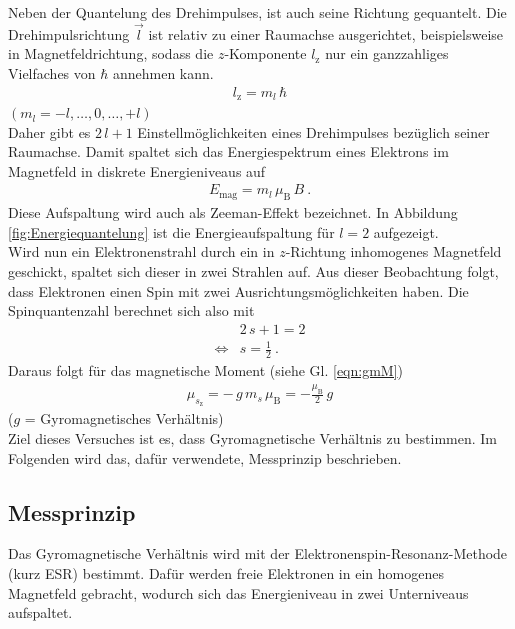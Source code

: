 Neben der Quantelung des Drehimpulses, ist auch seine Richtung gequantelt. Die Drehimpulsrichtung $\vec{l}$ ist relativ zu einer Raumachse ausgerichtet, beispielsweise in Magnetfeldrichtung, sodass die $z$-Komponente $l_\text{z}$ nur ein ganzzahliges Vielfaches von $\hbar$ annehmen kann.
\begin{align}
	l_\text{z} = m_l\, \hbar
\end{align}
\hspace{1.9cm} {\footnotesize$(m_l = -l, \dots, 0, \dots, +l)$} \vspace{0.25cm}\\
Daher gibt es $2\,l + 1$ Einstellmöglichkeiten eines Drehimpulses bezüglich seiner Raumachse. Damit spaltet sich das Energiespektrum eines Elektrons im Magnetfeld in diskrete Energieniveaus auf
\begin{align}
	E_\text{mag} = m_l\, \mu_\text{B}\, B \ .
\end{align}
Diese Aufspaltung wird auch als Zeeman-Effekt bezeichnet. In Abbildung \eqref{fig:Energiequantelung} ist die Energieaufspaltung für $l = 2$ aufgezeigt. \\
Wird nun ein Elektronenstrahl durch ein in $z$-Richtung inhomogenes Magnetfeld geschickt, spaltet sich dieser in zwei Strahlen auf. Aus dieser Beobachtung folgt, dass Elektronen einen Spin mit zwei Ausrichtungsmöglichkeiten haben. Die Spinquantenzahl berechnet sich also mit
\begin{align*}
	&2\, s + 1 = 2 \\
	\Leftrightarrow &s = \frac{1}{2} \ .
\end{align*}
Daraus folgt für das magnetische Moment (siehe Gl. \eqref{eqn:gmM})
\begin{align*}
	\mu_{s_\text{z}} = -\,g \,m_s \,\mu_\text{B} = -\frac{\mu_\text{B}}{2}\, g
\end{align*}
\hfill {\footnotesize($g$ = Gyromagnetisches Verhältnis)} \hfill \vspace{0.25cm}\\
Ziel dieses Versuches ist es, dass Gyromagnetische Verhältnis zu bestimmen. Im Folgenden wird das, dafür verwendete, Messprinzip beschrieben.



\subsection{Messprinzip}
Das Gyromagnetische Verhältnis wird mit der Elektronenspin-Resonanz-Methode (kurz ESR) bestimmt. Dafür werden freie Elektronen in ein homogenes Magnetfeld gebracht, wodurch sich das Energieniveau in zwei Unterniveaus aufspaltet.

